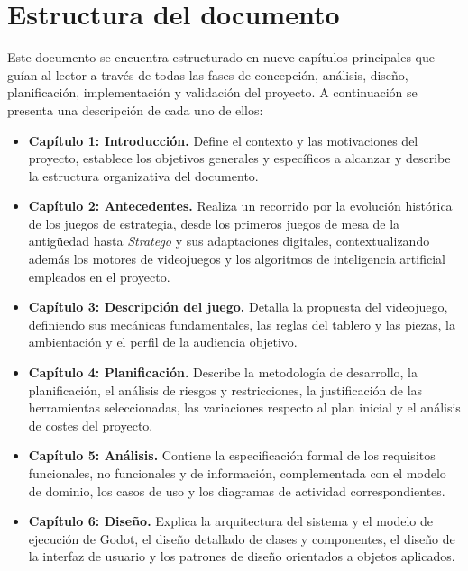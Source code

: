 \clearpage

\section{Estructura del documento}

Este documento se encuentra estructurado en nueve capítulos principales que guían al lector a través de todas las fases de concepción, análisis, diseño, planificación, implementación y validación del proyecto. A continuación se presenta una descripción de cada uno de ellos:

\begin{itemize}
	\item \textbf{Capítulo 1: Introducción.} Define el contexto y las motivaciones del proyecto, establece los objetivos generales y específicos a alcanzar y describe la estructura organizativa del documento.
	
	\item \textbf{Capítulo 2: Antecedentes.} Realiza un recorrido por la evolución histórica de los juegos de estrategia, desde los primeros juegos de mesa de la antigüedad hasta \textit{Stratego} y sus adaptaciones digitales, contextualizando además los motores de videojuegos y los algoritmos de inteligencia artificial empleados en el proyecto.
	
	\item \textbf{Capítulo 3: Descripción del juego.} Detalla la propuesta del videojuego, definiendo sus mecánicas fundamentales, las reglas del tablero y las piezas, la ambientación y el perfil de la audiencia objetivo.
	
	\item \textbf{Capítulo 4: Planificación.} Describe la metodología 
	de desarrollo, la planificación, el análisis de riesgos y restricciones, la justificación de las herramientas seleccionadas, las variaciones respecto al plan inicial y el análisis de costes del proyecto.
	
	\item \textbf{Capítulo 5: Análisis.} Contiene la especificación formal de los requisitos funcionales, no funcionales y de información, complementada con el modelo de dominio, los casos de uso y los diagramas de actividad correspondientes.
	
	\item \textbf{Capítulo 6: Diseño.} Explica la arquitectura del sistema y el modelo de ejecución de Godot, el diseño detallado de clases y componentes, el diseño de la interfaz de usuario y los patrones de diseño orientados a objetos aplicados.
	

\end{itemize}
